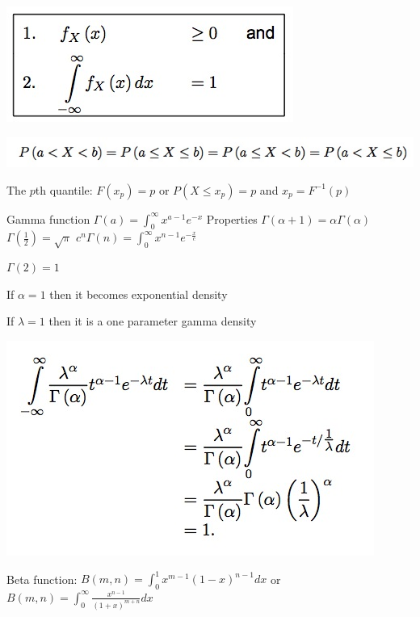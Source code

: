 \documentclass{examnotes}
\begin{document}
{\includegraphics[scale=0.7]{./img/2con3.jpg}

\includegraphics[scale=0.7]{./img/2con4.jpg}

The $p$th quantile: $F(x_p)=p$ \quad or $P(X\le x_p)=p$ \quad and $x_p=F^{-1}(p)$



Gamma function $\Gamma(a)=\displaystyle\int_0^\infty{x^{a-1}e^{-x}}$ \quad Properties $\Gamma(\alpha+1)=\alpha\Gamma(\alpha)$ \quad $\Gamma(\frac{1}{2})=\sqrt{\pi}$
\quad $c^n\Gamma(n)=\displaystyle\int_0^\infty{x^{n-1}e^{-\displaystyle\frac{x}{c}}}$

$\Gamma(2) = 1$ \vspace{6pt}

If $\alpha=1$ then it becomes exponential density


If $\lambda=1$ then it is a one parameter gamma density

\includegraphics[scale=0.4]{./img/2gam.jpg}




Beta function: $B(m,n)=\displaystyle\int_0^1{x^{m-1}(1-x)^{n-1}dx}$ \quad or $B(m,n)=\displaystyle\int_0^\infty{\frac{x^{n-1}}{(1+x)^{m+n}}dx}$

}
\end{document}
